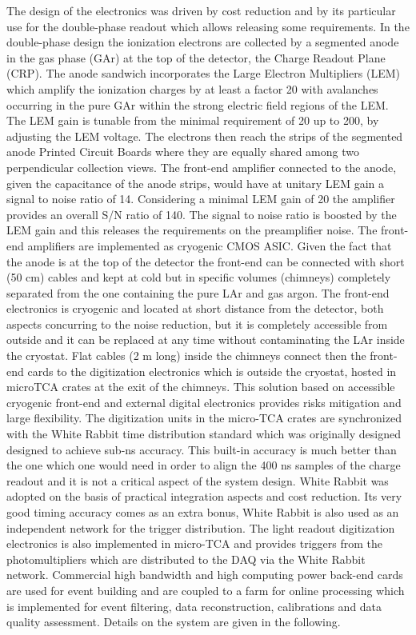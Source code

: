 The design of the electronics was driven by cost reduction and by its particular use for the double-phase readout which allows releasing some requirements. In the double-phase design the ionization electrons are collected by a segmented anode in the gas phase (GAr) at the top of the detector, the Charge Readout Plane (CRP). The anode sandwich incorporates the Large Electron Multipliers (LEM) which amplify the ionization charges by at least a factor 20 with avalanches occurring in the pure GAr within the strong electric field regions of the LEM. The LEM gain is tunable from the minimal requirement of 20 up to 200, by adjusting the LEM voltage. The electrons then reach the strips of the segmented anode Printed Circuit Boards where they are equally shared among two perpendicular collection views. The front-end amplifier connected to  the anode, given the capacitance of the anode strips, would have at unitary LEM gain a signal to noise ratio of 14. Considering a minimal LEM gain of 20  the amplifier provides an overall S/N ratio of 140. The signal to noise ratio is boosted by the LEM gain and this releases the requirements on the preamplifier noise. The front-end amplifiers are implemented as cryogenic CMOS ASIC. Given the fact that the anode is at the top of the detector the front-end can be connected with short (50 cm) cables and kept at cold but in specific volumes (chimneys) completely separated from the one containing the pure LAr and gas argon. The front-end electronics is cryogenic and located at short distance from the detector, both aspects concurring to the noise reduction, but it is completely accessible from outside and it can be replaced at any time without contaminating the LAr inside the cryostat. Flat cables (2 m long)  inside the chimneys connect then the front-end cards to the digitization electronics which is outside the cryostat, hosted in microTCA crates at the exit of the chimneys. This solution based on accessible cryogenic front-end and external digital electronics provides risks mitigation and large flexibility. The digitization units in the micro-TCA crates are synchronized with the White Rabbit time distribution standard which was originally designed designed to achieve sub-ns accuracy. This built-in accuracy is much better than the one which one would need in order to align the 400 ns samples of the charge readout and it is not a critical aspect of the system design. White Rabbit was adopted on the basis of practical integration aspects and cost reduction. Its very good timing accuracy comes as an extra bonus, White Rabbit is also used as an independent network for the trigger distribution. The light readout digitization electronics is also implemented in micro-TCA and provides triggers from the photomultipliers which are distributed to the DAQ via the White Rabbit network. Commercial high bandwidth and high computing power back-end cards are used for event building and are coupled to a farm for online processing which is implemented for event filtering, data reconstruction, calibrations and data quality assessment. Details on the system are given in the following.


